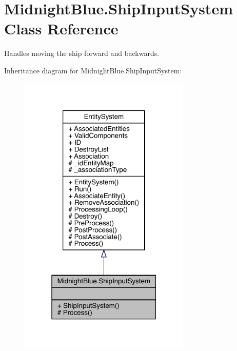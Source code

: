 \hypertarget{class_midnight_blue_1_1_ship_input_system}{}\section{Midnight\+Blue.\+Ship\+Input\+System Class Reference}
\label{class_midnight_blue_1_1_ship_input_system}


Handles moving the ship forward and backwards.  




Inheritance diagram for Midnight\+Blue.\+Ship\+Input\+System\+:\nopagebreak
\begin{figure}[H]
\begin{center}
\leavevmode
\includegraphics[width=232pt]{class_midnight_blue_1_1_ship_input_system__inherit__graph}
\end{center}
\end{figure}


